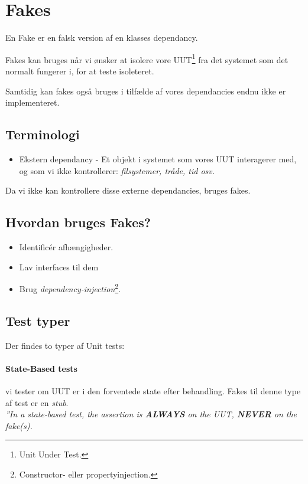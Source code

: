 \section{Fakes}

En Fake er en falsk version af en klasses dependancy.

Fakes kan bruges når vi ønsker at isolere vore UUT\footnote{Unit Under Test.} fra det systemet som det normalt fungerer i, for at teste isoleteret.

Samtidig kan fakes også bruges i tilfælde af vores dependancies endnu ikke er implementeret.

\subsection{Terminologi}
\begin{itemize}
	\item Ekstern dependancy - Et objekt i systemet som vores UUT interagerer med, og som vi ikke kontrollerer: \textit{filsystemer, tråde, tid osv.}
\end{itemize}

Da vi ikke kan kontrollere disse externe dependancies, bruges fakes.

\subsection{Hvordan bruges Fakes?}

\begin{itemize}
	\item Identificér afhængigheder.
	\item Lav interfaces til dem
	\item Brug \textit{dependency-injection}\footnote{Constructor- eller propertyinjection.}.
\end{itemize}

\subsection{Test typer}
Der findes to typer af Unit tests:

\paragraph{State-Based tests} vi tester om UUT er i den forventede state efter behandling. Fakes til denne type af test er en \textit{stub}. \\

\textit{''In a state-based test, the assertion is \textbf{ALWAYS} on the UUT, \textbf{NEVER} on the fake(s).}

